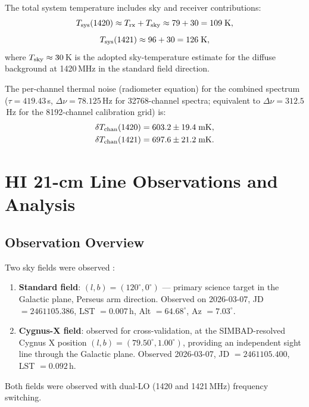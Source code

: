 \documentclass[10pt,preprint2]{aastex}
\begin{document}
The total system temperature includes sky and receiver contributions:
\begin{equation}
  T_{\rm sys}(1420) \approx T_{\rm rx} + T_{\rm sky} \approx 79 + 30 = 109\;\mathrm{K},
\end{equation}
\begin{equation}
  T_{\rm sys}(1421) \approx 96 + 30 = 126\;\mathrm{K},
\end{equation}
where $T_{\rm sky} \approx 30$\,K is the adopted sky-temperature estimate
for the diffuse background at 1420\,MHz in the standard field direction.

The per-channel thermal noise (radiometer equation) for the combined spectrum
($\tau = 419.43$\,s, $\Delta\nu = 78.125$\,Hz for 32768-channel spectra;
equivalent to $\Delta\nu = 312.5$\,Hz for the 8192-channel calibration grid) is:
\begin{align}
  \delta T_{\rm chan}(1420) &= 603.2 \pm 19.4\;\mathrm{mK},\\
  \delta T_{\rm chan}(1421) &= 697.6 \pm 21.2\;\mathrm{mK}.
\end{align}

\section{HI 21-cm Line Observations and Analysis}
\label{sec:hi_analysis}

\subsection{Observation Overview}
\label{sec:obs_overview}

Two sky fields were observed \citep{parsons2024bighorn}:
\begin{enumerate}
  \item \textbf{Standard field}: $(l,b) = (120^\circ, 0^\circ)$ ---
        primary science target in the Galactic plane,
        Perseus arm direction.
        Observed on 2026-03-07, JD $= 2461105.386$, LST $= 0.007$\,h,
        Alt $= 64.68^\circ$, Az $= 7.03^\circ$.
  \item \textbf{Cygnus-X field}: observed for cross-validation,
        at the SIMBAD-resolved Cygnus X position \citep{wenger2000}
        $(l,b) = (79.50^\circ, 1.00^\circ)$, providing an independent
        sight line through the Galactic plane.
        Observed 2026-03-07, JD $= 2461105.400$, LST $= 0.092$\,h.
\end{enumerate}
Both fields were observed with dual-LO (1420 and 1421\,MHz) frequency switching.
\end{document}
